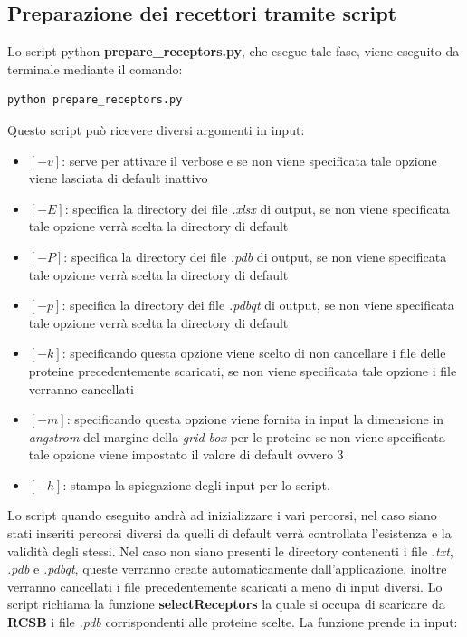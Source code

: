 \subsection{Preparazione dei recettori tramite script} \label{Preparazione dei recettori script}
Lo script python \textbf{prepare\_receptors.py}, che esegue tale fase, viene eseguito da terminale mediante il comando:

\begin{lstlisting}[language=Python, label=lst:code11, caption={funzione prepare\_receptors}]
python prepare_receptors.py
\end{lstlisting}

Questo script può ricevere diversi argomenti in input:

\begin{itemize}
    \item $[-v]$: serve per attivare il verbose e se non viene specificata tale opzione viene lasciata di default inattivo
    \item $[-E]$: specifica la directory dei file \textit{.xlsx} di output, se non viene specificata tale opzione verrà scelta la directory di default
    \item $[-P]$: specifica la directory dei file \textit{.pdb} di output, se non viene specificata tale opzione verrà scelta la directory di default
    \item $[-p]$: specifica la directory dei file \textit{.pdbqt} di output, se non viene specificata tale opzione verrà scelta la directory di default
    \item $[-k]$: specificando questa opzione viene scelto di non cancellare i file delle proteine precedentemente scaricati, se non viene specificata tale opzione i file verranno cancellati
    \item $[-m]$: specificando questa opzione viene fornita in input la dimensione in \textit{angstrom} del margine della \textit{grid box} per le proteine se non viene specificata tale opzione viene impostato il valore di default ovvero 3
    \item $[-h]$: stampa la spiegazione degli input per lo script.
\end{itemize}
Lo script quando eseguito andrà ad inizializzare i vari percorsi, nel caso siano stati inseriti percorsi diversi da quelli di default verrà controllata l'esistenza e la validità degli stessi. Nel caso non siano presenti le directory contenenti i file \textit{.txt}, \textit{.pdb} e \textit{.pdbqt}, queste verranno create automaticamente dall'applicazione, inoltre verranno cancellati i file precedentemente scaricati a meno di input diversi.\newline
Lo script richiama la funzione \textbf{selectReceptors} la quale si occupa di scaricare da \textbf{RCSB} i file \textit{.pdb} corrispondenti alle proteine scelte. La funzione prende in input: 

